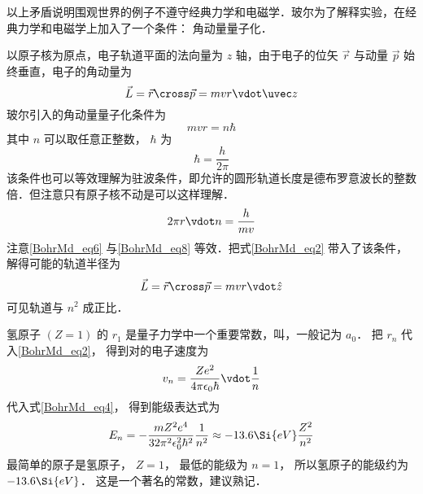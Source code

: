 以上矛盾说明围观世界的例子不遵守经典力学和电磁学．玻尔为了解释实验，在经典力学和电磁学上加入了一个条件： 角动量量子化．

以原子核为原点，电子轨道平面的法向量为 $z$ 轴，由于电子的位矢 $\vec r$ 与动量 $\vec p$ 始终垂直，电子的角动量为
\begin{equation}
\vec L = \vec r \cross \vec p = mvr \vdot \uvec z
\end{equation}
玻尔引入的角动量量子化条件为
\begin{equation}\label{BohrMd_eq6}
mvr = n\hbar 
\end{equation}
其中 $n$ 可以取任意正整数， $\hbar$ 为
\begin{equation}\label{BohrMd_eq7}
\hbar  = \frac{h}{2\pi}
\end{equation}
该条件也可以等效理解为驻波条件，即允许的圆形轨道长度是德布罗意波长的整数倍．但注意只有原子核不动是可以这样理解．
\begin{equation}\label{BohrMd_eq8}
2\pi r \vdot n = \frac{h}{mv}
\end{equation}
注意\autoref{BohrMd_eq6} 与\autoref{BohrMd_eq8} 等效．把式\autoref{BohrMd_eq2} 带入了该条件，解得可能的轨道半径为
\begin{equation}\label{BohrMd_eq9}
\vec L = \vec r \cross \vec p = mvr \vdot \hat z
\end{equation}
可见轨道与 $n^2$ 成正比．

氢原子 $(Z=1)$ 的 $r_1$ 是量子力学中一个重要常数，叫，一般记为 $a_0$． 把 $r_n$ 代入\autoref{BohrMd_eq2}， 得到对的电子速度为
\begin{equation}\label{BohrMd_eq10}
v_n = \frac{Z e^2}{4\pi\epsilon_0\hbar} \vdot \frac{1}{n}
\end{equation}
代入式\autoref{BohrMd_eq4}， 得到能级表达式为
\begin{equation}\label{BohrMd_eq11}
E_n =  - \frac{mZ^2 e^4}{32\pi^2\epsilon_0^2 \hbar ^2} \frac{1}{n^2} \approx  - 13.6\Si{eV}\frac{Z^2}{n^2}
\end{equation}
最简单的原子是氢原子， $Z = 1$， 最低的能级为 $n = 1$， 所以氢原子的能级约为 $-13.6\Si{eV}$． 这是一个著名的常数，建议熟记．









